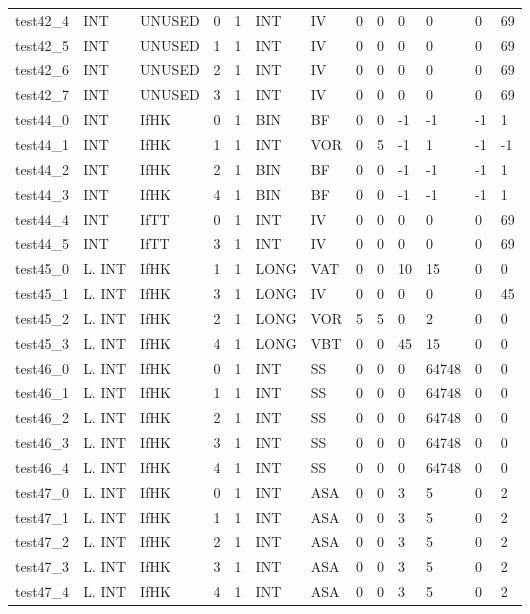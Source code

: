 \begin{longtable}{|l|l|l|p{0.5cm}|p{0.5cm}|l|p{0.5cm}|p{0.5cm}|p{0.5cm}|l|l|p{0.5cm}|l|}
test42\_4 & INT & UNUSED & 0 & 1 & INT & IV & 0 & 0 & 0 & 0 & 0 & 69 \\
test42\_5 & INT & UNUSED & 1 & 1 & INT & IV & 0 & 0 & 0 & 0 & 0 & 69 \\
test42\_6 & INT & UNUSED & 2 & 1 & INT & IV & 0 & 0 & 0 & 0 & 0 & 69 \\
test42\_7 & INT & UNUSED & 3 & 1 & INT & IV & 0 & 0 & 0 & 0 & 0 & 69 \\
test44\_0 & INT & IfHK & 0 & 1 & BIN & BF & 0 & 0 & -1 & -1 & -1 & 1 \\
test44\_1 & INT & IfHK & 1 & 1 & INT & VOR & 0 & 5 & -1 & 1 & -1 & -1 \\
test44\_2 & INT & IfHK & 2 & 1 & BIN & BF & 0 & 0 & -1 & -1 & -1 & 1 \\
test44\_3 & INT & IfHK & 4 & 1 & BIN & BF & 0 & 0 & -1 & -1 & -1 & 1 \\
test44\_4 & INT & IfTT & 0 & 1 & INT & IV & 0 & 0 & 0 & 0 & 0 & 69 \\
test44\_5 & INT & IfTT & 3 & 1 & INT & IV & 0 & 0 & 0 & 0 & 0 & 69 \\
test45\_0 & L. INT & IfHK & 1 & 1 & LONG & VAT & 0 & 0 & 10 & 15 & 0 & 0 \\
test45\_1 & L. INT & IfHK & 3 & 1 & LONG & IV & 0 & 0 & 0 & 0 & 0 & 45 \\
test45\_2 & L. INT & IfHK & 2 & 1 & LONG & VOR & 5 & 5 & 0 & 2 & 0 & 0 \\
test45\_3 & L. INT & IfHK & 4 & 1 & LONG & VBT & 0 & 0 & 45 & 15 & 0 & 0 \\
test46\_0 & L. INT & IfHK & 0 & 1 & INT & SS & 0 & 0 & 0 & 64748 & 0 & 0 \\
test46\_1 & L. INT & IfHK & 1 & 1 & INT & SS & 0 & 0 & 0 & 64748 & 0 & 0 \\
test46\_2 & L. INT & IfHK & 2 & 1 & INT & SS & 0 & 0 & 0 & 64748 & 0 & 0 \\
test46\_3 & L. INT & IfHK & 3 & 1 & INT & SS & 0 & 0 & 0 & 64748 & 0 & 0 \\
test46\_4 & L. INT & IfHK & 4 & 1 & INT & SS & 0 & 0 & 0 & 64748 & 0 & 0 \\
test47\_0 & L. INT & IfHK & 0 & 1 & INT & ASA & 0 & 0 & 3 & 5 & 0 & 2 \\
test47\_1 & L. INT & IfHK & 1 & 1 & INT & ASA & 0 & 0 & 3 & 5 & 0 & 2 \\
test47\_2 & L. INT & IfHK & 2 & 1 & INT & ASA & 0 & 0 & 3 & 5 & 0 & 2 \\
test47\_3 & L. INT & IfHK & 3 & 1 & INT & ASA & 0 & 0 & 3 & 5 & 0 & 2 \\
test47\_4 & L. INT & IfHK & 4 & 1 & INT & ASA & 0 & 0 & 3 & 5 & 0 & 2 \\
\hline
\end{longtable}
\normalsize
